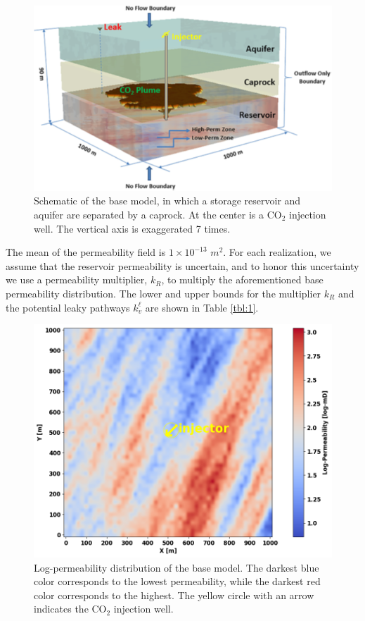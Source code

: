 \documentclass[10pt, twoside]{article}
\begin{document}
\begin{figure} [H]
\centering
\includegraphics[width=15 cm]{Figure 5.png}
\caption{Schematic of the base model, in which a storage reservoir and aquifer are separated by a caprock. At the center is a CO$_2$ injection well. The vertical axis is exaggerated 7 times.}
\label{model}
\end{figure}

The mean of the permeability field is $1\times10^{-13}$ $m^2$. For each realization, we assume that the reservoir permeability is uncertain, and to honor this uncertainty we use a permeability multiplier, $k_R$, to multiply the aforementioned base permeability distribution. The lower and upper bounds for the multiplier $k_R$ and the potential leaky pathways $k_v^\ell$ are shown in Table \ref{tbl:1}. 

\begin{figure} [H]
\centering
\includegraphics[width=10 cm]{Figure 6.png}
\caption{Log-permeability distribution of the base model. The darkest blue color corresponds to the lowest permeability, while the darkest red color corresponds to the highest. The yellow circle with an arrow indicates the CO$_2$ injection well.}
\label{perm_hete}
\end{figure}
\end{document}
